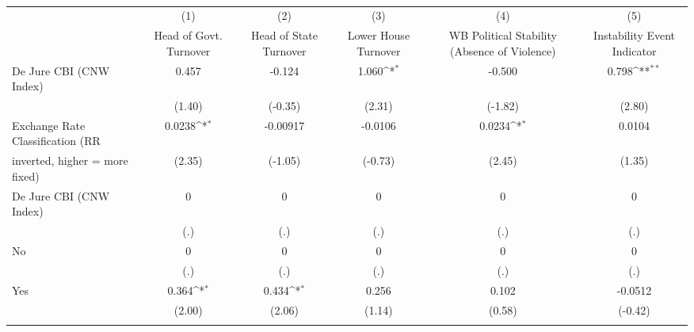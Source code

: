\begin{table}[htbp]\centering
\def\sym#1{\ifmmode^{#1}\else\(^{#1}\)\fi}
\caption{\label{ifullicmultIndFEDJ}}
\begin{tabular}{l*{5}{c}}
\toprule
                                        &\multicolumn{1}{c}{(1)}&\multicolumn{1}{c}{(2)}&\multicolumn{1}{c}{(3)}&\multicolumn{1}{c}{(4)}&\multicolumn{1}{c}{(5)}\\
                                        &\multicolumn{1}{c}{Head of Govt. Turnover}&\multicolumn{1}{c}{Head of State Turnover}&\multicolumn{1}{c}{Lower House Turnover}&\multicolumn{1}{c}{WB Political Stability (Absence of Violence)}&\multicolumn{1}{c}{Instability Event Indicator}\\
\midrule
De Jure CBI (CNW Index)                 &    0.457         &   -0.124         &    1.060\sym{*}  &   -0.500         &    0.798\sym{**} \\
                                        &   (1.40)         &  (-0.35)         &   (2.31)         &  (-1.82)         &   (2.80)         \\
\addlinespace
Exchange Rate Classification (RR        &   0.0238\sym{*}  & -0.00917         &  -0.0106         &   0.0234\sym{*}  &   0.0104         \\
inverted, higher = more fixed)          &   (2.35)         &  (-1.05)         &  (-0.73)         &   (2.45)         &   (1.35)         \\
\addlinespace
De Jure CBI (CNW Index)                 &        0         &        0         &        0         &        0         &        0         \\
                                        &      (.)         &      (.)         &      (.)         &      (.)         &      (.)         \\
\addlinespace
No                                      &        0         &        0         &        0         &        0         &        0         \\
                                        &      (.)         &      (.)         &      (.)         &      (.)         &      (.)         \\
\addlinespace
Yes                                     &    0.364\sym{*}  &    0.434\sym{*}  &    0.256         &    0.102         &  -0.0512         \\
                                        &   (2.00)         &   (2.06)         &   (1.14)         &   (0.58)         &  (-0.42)         \\
\addlinespace

\end{tabular}
\end{table}
